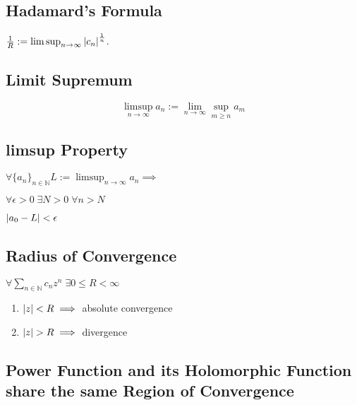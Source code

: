 
\subsection{Hadamard's Formula} %
\label{sub:hadamard_s_formula}

$\frac{1}{R} := \limsup_{n \to \infty} \left|c_n\right|^\frac{1}{n}$.


\subsection{Limit Supremum} %
\label{sub:limit_supremum}
\begin{equation*}
	\limsup_{n \to \infty} a_n := \lim_{n \to \infty} \sup_{m \geq n} a_m
\end{equation*}

\subsection{limsup Property} %
\label{sub:limsup_property}
$\forall \{a_n\}_{n \in \mathbb{N}} L:=\limsup_{n \to \infty} a_n \implies$

$\forall \epsilon > 0 \; \exists N > 0 \; \forall n > N$

$\left|a_0 - L\right| < \epsilon$


\subsection{Radius of Convergence} %
\label{sub:radius_of_convergence}
$\forall \sum_{n \in \mathbb{N}} c_n z^n \; \exists 0 \leq R < \infty$
\begin{enumerate}
	\item $\left|z\right| < R \implies$ absolute convergence
	\item $\left|z\right| > R \implies$ divergence
\end{enumerate}

\subsection{Power Function and its Holomorphic Function share the same Region of Convergence} %
\label{sub:power_function_and_its_holomorphic_function_share_the_same_region_of_convergence}

